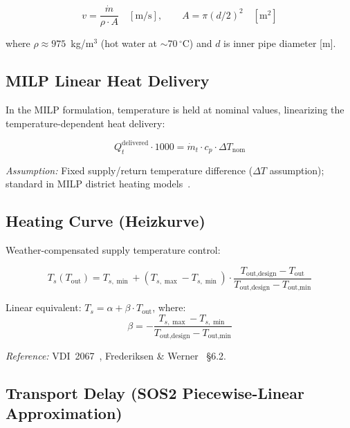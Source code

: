 \documentclass[a4paper,12pt]{article}
\begin{document}
\begin{equation}
  v = \frac{\dot{m}}{\rho \cdot A}
  \quad [\text{m/s}],
  \qquad
  A = \pi (d/2)^{2} \quad [\text{m}^{2}]
  \tag{PH-4}
  \label{eq:ph4}
\end{equation}

where $\rho \approx 975$~kg/m$^3$ (hot water at $\sim$70\,$^{\circ}$C) and $d$ is inner
pipe diameter [m].

\subsection{MILP Linear Heat Delivery}

In the MILP formulation, temperature is held at nominal values, linearizing the
temperature-dependent heat delivery:

\begin{equation}
  Q^{\text{delivered}}_{t} \cdot 1000
  = \dot{m}_{t} \cdot c_p \cdot \Delta T_{\text{nom}}
  \tag{PH-5}
  \label{eq:ph5}
\end{equation}

\noindent\textit{Assumption:} Fixed supply/return temperature difference
($\Delta T$ assumption); standard in MILP district heating
models~\cite{Vesterlund2017,Mesfun2015}.

\subsection{Heating Curve (Heizkurve)}

Weather-compensated supply temperature control:

\begin{equation}
  T_s(T_{\text{out}})
  = T_{s,\min}
    + (T_{s,\max} - T_{s,\min})
      \cdot \frac{T_{\text{out,design}} - T_{\text{out}}}{T_{\text{out,design}} - T_{\text{out,min}}}
  \tag{PH-6}
  \label{eq:heating-curve}
\end{equation}

Linear equivalent: $T_s = \alpha + \beta \cdot T_{\text{out}}$, where:
\[
  \beta = -\frac{T_{s,\max} - T_{s,\min}}{T_{\text{out,design}} - T_{\text{out,min}}}
\]

\noindent\textit{Reference:} VDI~2067~\cite{VDI2067}, Frederiksen \&
Werner~\cite{Frederiksen2013} \S6.2.

\subsection{Transport Delay (SOS2 Piecewise-Linear Approximation)}
\end{document}
